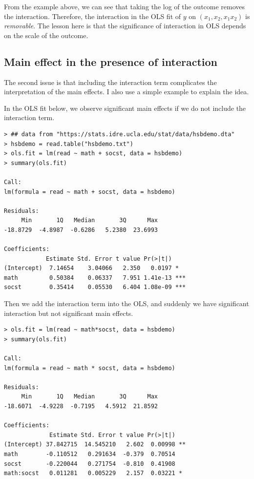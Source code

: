 From the example above, we can see that taking the log of the outcome removes the interaction. Therefore, the interaction in the OLS fit of $y$ on $(x_1,x_2, x_1x_2)$ is {\it removable}. The lesson here is that the significance of interaction in OLS depends on the scale of the outcome. 


\subsection{Main effect in the presence of interaction}\label{sec::main-interaction-centering}

The second issue is that including the interaction term complicates the interpretation of the main effects. I also use a simple example to explain the idea. 
 

In the OLS fit below, we observe significant main effects if we do not include the interaction term. 

\begin{lstlisting}
> ## data from "https://stats.idre.ucla.edu/stat/data/hsbdemo.dta"
> hsbdemo = read.table("hsbdemo.txt")
> ols.fit = lm(read ~ math + socst, data = hsbdemo)
> summary(ols.fit)

Call:
lm(formula = read ~ math + socst, data = hsbdemo)

Residuals:
     Min       1Q   Median       3Q      Max 
-18.8729  -4.8987  -0.6286   5.2380  23.6993 

Coefficients:
            Estimate Std. Error t value Pr(>|t|)    
(Intercept)  7.14654    3.04066   2.350   0.0197 *  
math         0.50384    0.06337   7.951 1.41e-13 ***
socst        0.35414    0.05530   6.404 1.08e-09 ***
\end{lstlisting}

Then we add the interaction term into the OLS, and suddenly we have
significant interaction but not significant main effects. 
\begin{lstlisting}
> ols.fit = lm(read ~ math*socst, data = hsbdemo)
> summary(ols.fit)

Call:
lm(formula = read ~ math * socst, data = hsbdemo)

Residuals:
     Min       1Q   Median       3Q      Max 
-18.6071  -4.9228  -0.7195   4.5912  21.8592 

Coefficients:
             Estimate Std. Error t value Pr(>|t|)   
(Intercept) 37.842715  14.545210   2.602  0.00998 **
math        -0.110512   0.291634  -0.379  0.70514   
socst       -0.220044   0.271754  -0.810  0.41908   
math:socst   0.011281   0.005229   2.157  0.03221 * 
\end{lstlisting}

